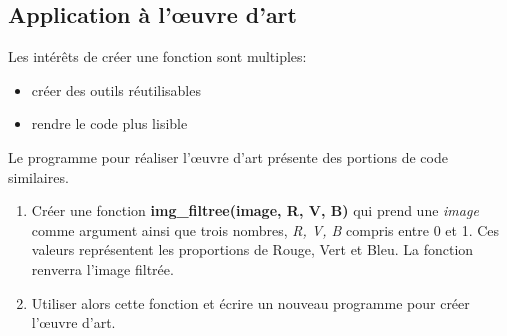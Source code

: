 \documentclass[a4paper,11pt]{article}
\begin{document}
\begin{Form}
\subsection{Application à l'œuvre d'art}
\begin{commentprof}
Les intérêts de créer une fonction sont multiples:
\begin{itemize}
\item créer des outils réutilisables
\item rendre le code plus lisible
\end{itemize} 
\end{commentprof}
Le programme pour réaliser l'œuvre d'art présente des portions de code similaires. 
\begin{activite}
\begin{enumerate}
\item Créer une fonction \textbf{img\_filtree(image, R, V, B)} qui prend une \emph{image} comme argument ainsi que trois nombres, \emph{R, V, B} compris entre 0 et 1. Ces valeurs représentent les proportions de Rouge, Vert et Bleu. La fonction renverra l'image filtrée.
\item Utiliser alors cette fonction et écrire un nouveau programme pour créer l'œuvre d'art.
\end{enumerate}
\end{activite}
\end{Form}
\end{document}
